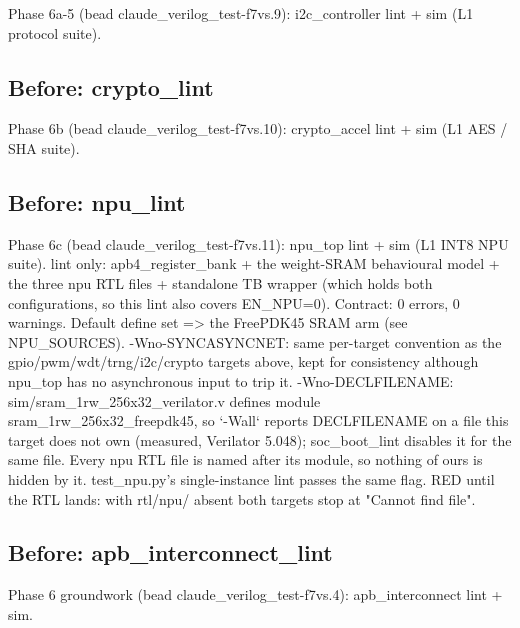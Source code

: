 \begin{record}
\begin{textblock}
Phase 6a-5 (bead claude_verilog_test-f7vs.9): i2c_controller lint + sim (L1 protocol suite).
\end{textblock}

\subsection*{Before: crypto\_lint}

\begin{textblock}
Phase 6b (bead claude_verilog_test-f7vs.10): crypto_accel lint + sim (L1 AES / SHA suite).
\end{textblock}

\subsection*{Before: npu\_lint}

\begin{textblock}
Phase 6c (bead claude_verilog_test-f7vs.11): npu_top lint + sim (L1 INT8 NPU suite).
lint only: apb4_register_bank + the weight-SRAM behavioural model + the three npu RTL files +
standalone TB wrapper (which holds both configurations, so this lint also covers EN_NPU=0).
Contract: 0 errors, 0 warnings.  Default define set => the FreePDK45 SRAM arm (see NPU_SOURCES).
-Wno-SYNCASYNCNET: same per-target convention as the gpio/pwm/wdt/trng/i2c/crypto targets above,
kept for consistency although npu_top has no asynchronous input to trip it.
-Wno-DECLFILENAME: sim/sram_1rw_256x32_verilator.v defines module sram_1rw_256x32_freepdk45, so
`-Wall` reports DECLFILENAME on a file this target does not own (measured, Verilator 5.048);
soc_boot_lint disables it for the same file. Every npu RTL file is named after its module, so
nothing of ours is hidden by it. test_npu.py's single-instance lint passes the same flag.
RED until the RTL lands: with rtl/npu/ absent both targets stop at "Cannot find file".
\end{textblock}

\subsection*{Before: apb\_interconnect\_lint}

\begin{textblock}
Phase 6 groundwork (bead claude_verilog_test-f7vs.4): apb_interconnect lint + sim.
\end{textblock}


\end{record}
